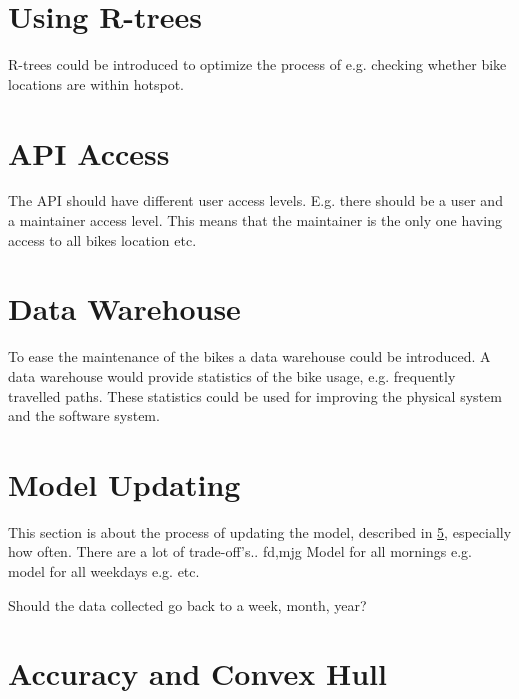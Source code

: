 \section{Using R-trees}
R-trees\cite[Section 25.3.5.3]{database_system_concepts} could be introduced to optimize the process of e.g. checking whether bike locations are within hotspot.

\section{API Access}
The API should have different user access levels.
E.g. there should be a user and a maintainer access level.
This means that the maintainer is the only one having access to all bikes location etc.

\section{Data Warehouse \cite{data_warehousing}}
To ease the maintenance of the bikes a data warehouse could be introduced.
A data warehouse would provide statistics of the bike usage, e.g. frequently travelled paths.
These statistics could be used for improving the physical system and the software system.

\section{Model Updating}
This section is about the process of updating the model, described in \cref{}, especially how often.
There are a lot of trade-off's.. fd,mjg  
Model for all mornings e.g.
model for all weekdays e.g.
etc.

Should the data collected go back to a week, month, year?

\section{Accuracy and Convex Hull}